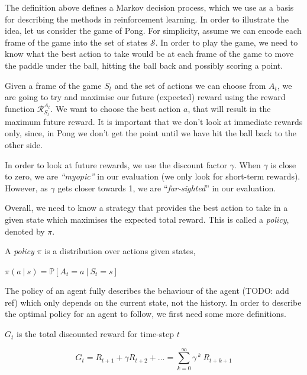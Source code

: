 The definition above defines a Markov decision process, which we use as a basis for describing the methods in reinforcement learning. In order to illustrate the idea, let us consider the game of Pong. For simplicity, assume we can encode each frame of the game into the set of states $\mathcal{S}$. In order to play the game, we need to know what the best action to take would be at each frame of the game to move the paddle under the ball, hitting the ball back and possibly scoring a point.

Given a frame of the game $S_t$ and the set of actions we can choose from $A_t$, we are going to try and maximise our future (expected) reward using the reward function $\mathcal{R}_{S_t}^{A_t}$. We want to choose the best action $a$, that will result in the maximum future reward. It is important that we don't look at immediate rewards only, since, in Pong we don't get the point until we have hit the ball back to the other side.

In order to look at future rewards, we use the discount factor $\gamma$. When $\gamma$ is close to zero, we are \textit{``myopic''} in our evaluation (we only look for short-term rewards). However, as $\gamma$ gets closer towards 1, we are ``\textit{far-sighted}'' in our evaluation.

Overall, we need to know a strategy that provides the best action to take in a given state which maximises the expected total reward. This is called a \textit{policy}, denoted by $\pi$.

\begin{defn}
	A \textit{policy} $\pi$ is a distribution over actions given states,
	\begin{center}
		$\pi(a~|~s)=\mathbb{P}[A_t=a~|~S_t=s]$
	\end{center}
\end{defn}

The policy of an agent fully describes the behaviour of the agent (TODO: add ref) which only depends on the current state, not the history. In order to describe the optimal policy for an agent to follow, we first need some more definitions.

\begin{defn}
	$G_t$ is the total discounted reward for time-step $t$
	\vspace*{-7mm}
	\begin{center}
		$$G_t = R_{t+1} + \gamma R_{t+2} + \dots = \sum_{k=0}^{\infty}\gamma^{~k}~R_{t+k+1}$$
	\end{center}
\end{defn}

